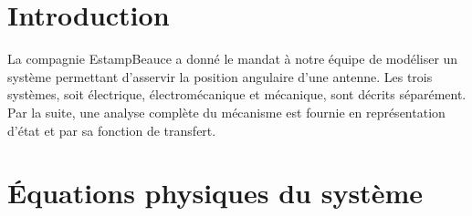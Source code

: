 \documentclass{udes_rapport} %
\begin{document}




\newpage

\tableofcontents
\newpage


\listoffigures
\newpage



\setcounter{page}{1} %
\section{Introduction}
La compagnie EstampBeauce a donné le mandat à notre équipe de modéliser un système permettant d'asservir la 
position angulaire d'une antenne. Les trois systèmes, soit électrique, électromécanique et mécanique, sont décrits séparément. 
Par la suite, une analyse complète du mécanisme est fournie en représentation d'état et par sa fonction de transfert.

\section{Équations physiques du système}
\end{document}
